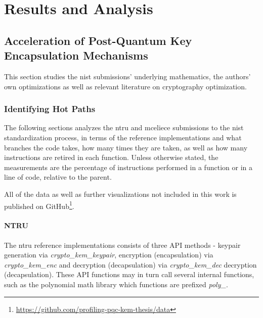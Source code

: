 \chapter{Results and Analysis}
\label{chapter:results}

\section{Acceleration of Post-Quantum Key Encapsulation Mechanisms}


This section studies the \gls{nist} submissions' underlying mathematics, the authors' own optimizations as well as relevant literature on cryptography optimization.

\subsection{Identifying Hot Paths}
\label{section:results:hot-paths}

The following sections analyzes the \gls{ntru} and \gls{mceliece} submissions to the \gls{nist} standardization process, in terms of the reference implementations and what branches the code takes, how many times they are taken, as well as how many instructions are retired in each function. Unless otherwise stated, the measurements are the percentage of instructions performed in a function or in a line of code, relative to the parent.

All of the data as well as further visualizations not included in this work is published on GitHub\footnote{\href{https://github.com/profiling-pqc-kem-thesis/data}{https://github.com/profiling-pqc-kem-thesis/data}}.

\subsubsection{NTRU}

The \gls{ntru} reference implementations consists of three API methods - keypair generation via \textit{crypto\_kem\_keypair}, encryption (encapsulation) via \textit{crypto\_kem\_enc} and decryption (decapsulation) via \textit{crypto\_kem\_dec}  decryption (decapsulation). These API functions may in turn call several internal functions, such as the polynomial math library which functions are prefixed \textit{poly\_}.

